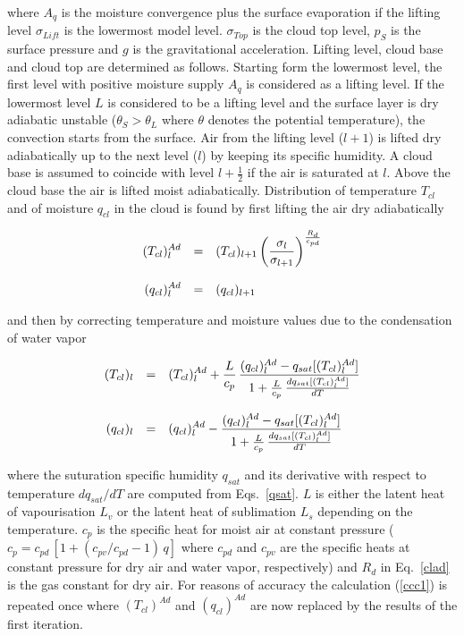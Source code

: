 where $A_q$ is the moisture convergence plus the
surface evaporation if the lifting level
$\sigma_{Lift}$ is the lowermost model level.
$\sigma_{Top}$ is the cloud top level, $p_S$ is
the surface pressure and $g$ is the gravitational
acceleration. Lifting level, cloud base and cloud
top are determined as follows. Starting form the
lowermost level, the first level with positive
moisture supply $A_q$ is considered  as a lifting level. If the lowermost level $L$ is considered
to be a lifting level and the surface layer is dry adiabatic unstable ($\theta_S > \theta_L$
where $\theta$ denotes the potential temperature), the convection starts from the surface.
Air from the lifting level ($l+1$) is lifted dry
adiabatically up to the next level ($l$) by keeping  its
specific humidity. A cloud base is
assumed to coincide with level $l+\frac{1}{2}$ if the
air is saturated at $l$. Above the cloud
base the air is lifted moist adiabatically. Distribution of
temperature $T_{cl}$ and of moisture
$q_{cl}$ in the cloud is found by first lifting the air
dry adiabatically

\begin{equation}\label{clad}
\begin{array}{rcl}
\displaystyle (T_{cl})_l^{Ad} & = & \displaystyle (T_{cl})_{l+1}
\left(\frac{\sigma_l}{\sigma_{l+1}}\right)^{\frac{R_
d}{c_{pd}}} \\
&&\\
\displaystyle (q_{cl})_l^{Ad}  & = & \displaystyle (q_{cl})_{l+1} 
\end{array}
\end{equation}

and then by correcting temperature and moisture values
due to the condensation of water vapor 

\begin{equation}\label{ccc1}
\begin{array}{rcl}
\displaystyle (T_{cl})_l & = & \displaystyle (T_{cl})_l^{Ad} +
\frac{L}{c_p} \, \frac{(q_{cl})_l^{Ad} - q_{sat}
[(T_{cl})_l^{Ad}]}{1+\frac{L}{c_p}\,
\frac{dq_{sat}[(T_{cl})_l^{Ad}]}{dT}} \\
&&\\
\displaystyle (q_{cl})_l & = & \displaystyle (q_{cl})_l^{Ad}
-\frac{(q_{cl})_l^{Ad} - q_{sat}[(T_
{cl})_l^{Ad}]}{1+\frac{L}{c_p}\,
\frac{dq_{sat}[(T_{cl})_l^{Ad}]}{dT}} 
\end{array}
\end{equation}

where the suturation specific humidity $q_{sat}$  and
its derivative with respect to temperature 
$dq_{sat}/dT$ are computed from Eqs.~\ref{qsat}.
$L$ is
either the latent heat of vapourisation $L_v$ or
the latent heat of  sublimation $L_s$ depending on the
temperature.
$c_p$ is the specific
heat for moist air at constant pressure ($c_p= c_{pd} \,
[1+(c_{pv}/c_{pd}-1)\, q]$ where
$c_{pd}$ and $c_{pv}$ are the specific heats at
constant pressure for dry air and water vapor,
respectively) and $R_d$ in Eq.~\ref{clad} is the gas
constant for dry air.
For reasons of accuracy the calculation (\ref{ccc1}) is
repeated once where $(T_{cl})^{Ad}$
and $(q_{cl})^{Ad}$ are now replaced by the results
of the first iteration.


